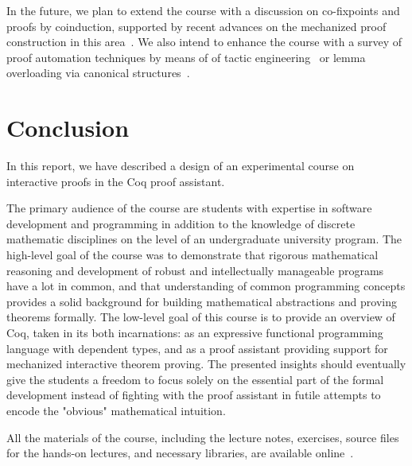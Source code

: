 \documentclass[blockstyle,preprint,nocopyrightspace]{sigplanconf}
\newcommand{\todo}[1]{\textcolor{red}{({#1})}}
\newcommand{\an}[1]{\textcolor{red}{(Aleks: {#1})}}
\begin{document}
In the future, we plan to extend the course with a discussion on
co-fixpoints and proofs by coinduction, supported by recent advances
on the mechanized proof construction in this
area~\cite{Hur-al:POPL13}. We also intend to enhance the course with a
survey of proof automation techniques by means of of tactic
engineering~\cite{Stampoulis-Shao:ICFP10,Ziliani-al:ICFP13} or lemma
overloading via canonical
structures~\cite{Gonthier-al:JFP13,Mahboubi-Tassi:ITP13}.

\section{Conclusion}
\label{sec:conclusion}

In this report, we have described a design of an experimental course
on interactive proofs in the Coq proof assistant.

The primary audience of the course are students with expertise in
software development and programming in addition to the knowledge of
discrete mathematic disciplines on the level of an undergraduate
university program. The high-level goal of the course was to
demonstrate that rigorous mathematical reasoning and development of
robust and intellectually manageable programs have a lot in common,
and that understanding of common programming concepts provides a solid
background for building mathematical abstractions and proving theorems
formally. The low-level goal of this course is to provide an overview
of Coq, taken in its both incarnations: as an expressive functional
programming language with dependent types, and as a proof assistant
providing support for mechanized interactive theorem proving.
%
%
The presented insights should eventually give the students a freedom
to focus solely on the essential part of the formal development
instead of fighting with the proof assistant in futile attempts to
encode the "obvious" mathematical intuition.
%

All the materials of the course, including the lecture notes,
exercises, source files for the hands-on lectures, and necessary
libraries, are available online~\cite{Sergey:PnP}.





\end{document}

